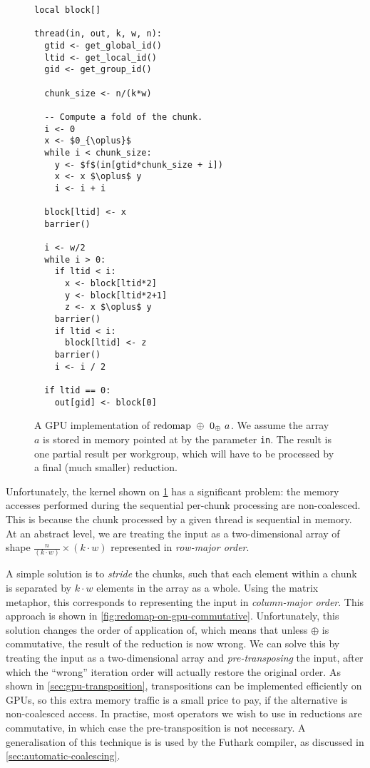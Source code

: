 \begin{figure}

\begin{lstlisting}[language={},mathescape]
local block[]

thread(in, out, k, w, n):
  gtid <- get_global_id()
  ltid <- get_local_id()
  gid <- get_group_id()

  chunk_size <- n/(k*w)

  -- Compute a fold of the chunk.
  i <- 0
  x <- $0_{\oplus}$
  while i < chunk_size:
    y <- $f$(in[gtid*chunk_size + i])
    x <- x $\oplus$ y
    i <- i + i

  block[ltid] <- x
  barrier()

  i <- w/2
  while i > 0:
    if ltid < i:
      x <- block[ltid*2]
      y <- block[ltid*2+1]
      z <- x $\oplus$ y
    barrier()
    if ltid < i:
      block[ltid] <- z
    barrier()
    i <- i / 2

  if ltid == 0:
    out[gid] <- block[0]
\end{lstlisting}

  \caption{A GPU implementation of $\mathrm{redomap}~\oplus~0_{\oplus}~a$.  We
    assume the array $a$ is stored in memory pointed at by the
    parameter \texttt{in}.  The result is one partial result per
    workgroup, which will have to be processed by a final (much
    smaller) reduction.}
  \label{fig:redomap-on-gpu}
\end{figure}

Unfortunately, the kernel shown on \cref{fig:redomap-on-gpu} has a
significant problem: the memory accesses performed during the
sequential per-chunk processing are non-coalesced.  This is because
the chunk processed by a given thread is sequential in memory.  At an
abstract level, we are treating the input as a two-dimensional array
of shape $\frac{n}{(k\cdot{}w)}\times(k\cdot{}w)$ represented in
\textit{row-major order}.

A simple solution is to \textit{stride} the chunks, such that each
element within a chunk is separated by $k\cdot{}w$ elements in the
array as a whole.  Using the matrix metaphor, this corresponds to
representing the input in \textit{column-major order}.  This approach
is shown in \cref{fig:redomap-on-gpu-commutative}.  Unfortunately,
this solution changes the order of application of, which means that
unless $\oplus$ is commutative, the result of the reduction is now
wrong.  We can solve this by treating the input as a two-dimensional
array and \textit{pre-transposing} the input, after which the
``wrong'' iteration order will actually restore the original order.
As shown in \cref{sec:gpu-transposition}, transpositions can be
implemented efficiently on GPUs, so this extra memory traffic is a
small price to pay, if the alternative is non-coalesced access.  In
practise, most operators we wish to use in reductions are commutative,
in which case the pre-transposition is not necessary.  A
generalisation of this technique is is used by the Futhark compiler,
as discussed in \cref{sec:automatic-coalescing}.

